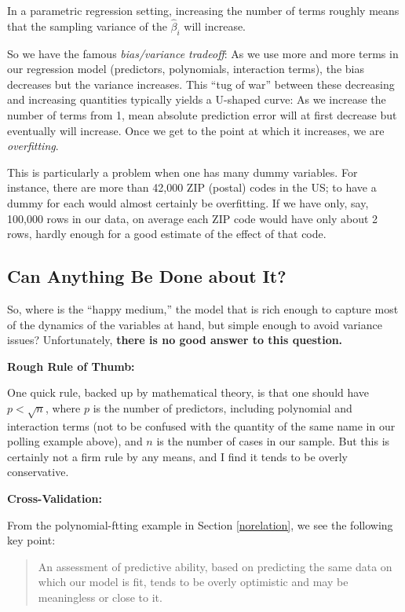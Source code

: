 In a parametric regression setting, increasing the number of terms
roughly means that the sampling variance of the $\widehat{\beta}_i$ will
increase.

So we have the famous \textit{bias/variance tradeoff}:  As we use more and
more terms in our regression model (predictors, polynomials, interaction
terms), the bias decreases but the variance increases.  This ``tug of
war'' between these decreasing and increasing quantities typically
yields a U-shaped curve:  As we increase the number of terms from 1,
mean absolute prediction error will at first decrease but eventually
will increase.  Once we get to the point at which it increases, we are
\textit{overfitting}.

This is particularly a problem when one has many dummy variables. For
instance, there are more than 42,000 ZIP (postal) codes in the US; to
have a dummy for each would almost certainly be overfitting.  If we have
only, say, 100,000 rows in our data, on average each ZIP code would have
only about 2 rows, hardly enough for a good estimate of the effect of
that code.

\subsection{Can Anything Be Done about It?}
\label{dosomething}

So, where is the ``happy medium,'' the model that is rich enough to
capture most of the dynamics of the variables at hand, but simple enough
to avoid variance issues?  Unfortunately, \textbf{there is no good answer to
this question.}

\textbf{Rough Rule of Thumb:}

One quick rule, backed up by mathematical theory, is that one should
have $p < \sqrt{n}$, where $p$ is the number of predictors, including
polynomial and interaction terms (not to be confused with the quantity
of the same name in our polling example above), and $n$ is the number of
cases in our sample.  But this is certainly not a firm rule by any
means, and I find it tends to be overly conservative.

\textbf{Cross-Validation:}

From the polynomial-ftting example in Section \ref{norelation}, we see
the following key point:

\begin{quote}
An assessment of predictive ability, based on predicting the same data
on which our model is fit, tends to be overly optimistic and may be
meaningless or close to it.
\end{quote}

